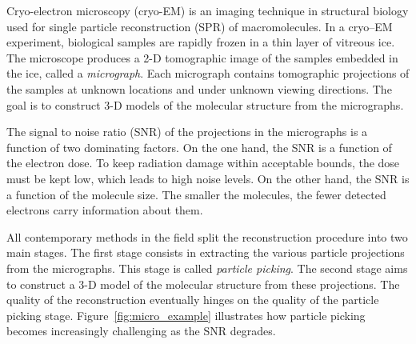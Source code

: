 \documentclass[12pt]{article}
\newcommand{\1}{\mathbf{1}}
\theoremstyle{plain}
\theoremstyle{definition}
\theoremstyle{remark}
\theoremstyle{plain}
\theoremstyle{remark}
\theoremstyle{plain}
\theoremstyle{plain}
\begin{document}
Cryo-electron microscopy (cryo-EM) is an imaging technique in structural biology used for single particle reconstruction (SPR) of macromolecules.
In a cryo--EM experiment, biological samples are rapidly frozen in a thin layer of vitreous ice. %
The microscope produces a 2-D tomographic image of the samples embedded in the ice, called a \emph{micrograph}. Each micrograph contains tomographic projections of the samples at unknown locations and under unknown viewing directions. The goal is to construct 3-D models of the molecular structure from the micrographs.

The signal to noise ratio (SNR) of the projections in the micrographs is a function of two dominating factors. On the one hand, the SNR is a function of the electron dose. To keep radiation damage within acceptable bounds, the dose must be kept low, which leads to high noise levels. On the other hand, the SNR is a function of the molecule size. The smaller the molecules, the fewer detected electrons carry information about them.

All contemporary methods in the field split the reconstruction procedure into two main  stages.
The first stage consists in extracting the various particle projections from the micrographs. This stage is called \emph{particle picking}. The second stage aims to construct a 3-D model of the molecular structure from these projections. The quality of the reconstruction eventually hinges on the quality of the particle picking stage. Figure~\ref{fig:micro_example} illustrates how particle picking becomes increasingly challenging as the SNR degrades.
\end{document}

